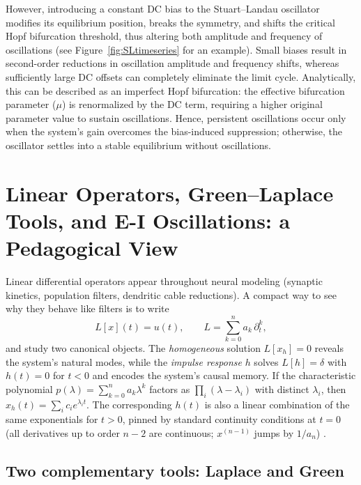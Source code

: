  
 


 
 

However, introducing a constant DC bias to the Stuart–Landau oscillator modifies its equilibrium position, breaks the symmetry, and shifts the critical Hopf bifurcation threshold, thus altering both amplitude and frequency of oscillations (see Figure~\ref{fig:SLtimeseries} for an example). Small biases result in second-order reductions in oscillation amplitude and frequency shifts, whereas sufficiently large DC offsets can completely eliminate the limit cycle. Analytically, this can be described as an imperfect Hopf bifurcation: the effective bifurcation parameter ($\mu$) is renormalized by the DC term, requiring a higher original parameter value to sustain oscillations. Hence, persistent oscillations occur only when the system’s gain overcomes the bias-induced suppression; otherwise, the oscillator settles into a stable equilibrium without oscillations.



 

\clearpage 


\section{Linear Operators, Green--Laplace Tools, and E-I Oscillations: a Pedagogical View}
\label{app:L-op}

Linear differential operators appear throughout neural modeling (synaptic kinetics, population filters, dendritic cable reductions). A compact way to see why they behave like filters is to write
\[
L[x](t)=u(t),\qquad L=\sum_{k=0}^n a_k\,\partial_t^k,
\]
and study two canonical objects. The \emph{homogeneous} solution \(L[x_h]=0\) reveals the system's natural modes, while the \emph{impulse response} \(h\) solves \(L[h]=\delta\) with \(h(t)=0\) for \(t<0\) and encodes the system's causal memory. If the characteristic polynomial \(p(\lambda)=\sum_{k=0}^n a_k\lambda^k\) factors as \(\prod_i(\lambda-\lambda_i)\) with distinct \(\lambda_i\), then \(x_h(t)=\sum_i c_i e^{\lambda_i t}\). The corresponding \(h(t)\) is also a linear combination of the same exponentials for \(t>0\), pinned by standard continuity conditions at \(t=0\) (all derivatives up to order \(n-2\) are continuous; \(x^{(n-1)}\) jumps by \(1/a_n\))  \cite{StakgoldHolst2011}.

\subsection{Two complementary tools: Laplace and Green}
